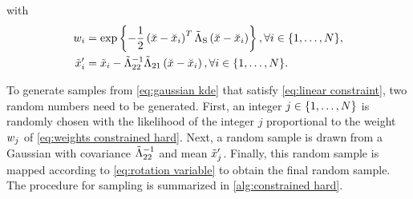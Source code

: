 with
\begin{align}
	\label{eq:weights constrained hard}
	w_{i} &= \exp\left\{  -\frac{1}{2} \left( \breve{x} - \breve{x}_{i} \right)^T
		\tilde{\Lambda}_{\mathrm{S}}
		\left( \breve{x} - \breve{x}_{i} \right) \right\},
	\forall i \in \{1,\ldots,N\}, \\
	\label{eq:offset constrained hard}
	\tilde{x}_{i}' &= \tilde{x}_{i} - \tilde{\Lambda}_{22}^{-1} \tilde{\Lambda}_{21}
	\left( \breve{x} - \breve{x}_{i} \right),
	\forall i \in \{1,\ldots,N\}.
\end{align}

To generate samples from \cref{eq:gaussian kde} that satisfy \cref{eq:linear constraint}, two random numbers need to be generated. 
First, an integer $j\in\{1,\ldots,N\}$ is randomly chosen with the likelihood of the integer $j$ proportional to the weight $w_{j}$ of \cref{eq:weights constrained hard}. 
Next, a random sample is drawn from a Gaussian with covariance $\tilde{\Lambda}_{22}^{-1}$ and mean $\tilde{x}_{j}'$.
Finally, this random sample is mapped according to \cref{eq:rotation variable} to obtain the final random sample.
The procedure for sampling is summarized in \cref{alg:constrained hard}.

